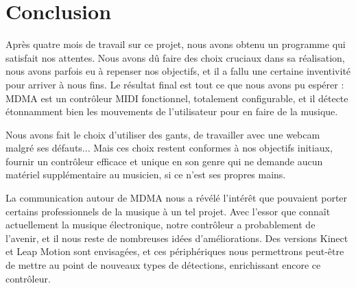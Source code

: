 \section{Conclusion}
\par Après quatre mois de travail sur ce projet, nous avons obtenu un programme qui satisfait nos attentes. Nous avons dû faire des choix cruciaux dans sa réalisation, nous avons parfois eu à repenser nos objectifs, et il a fallu une certaine inventivité pour arriver à nous fins. Le résultat final est tout ce que nous avons pu espérer : MDMA est un contrôleur MIDI fonctionnel, totalement configurable, et il détecte étonnamment bien les mouvements de l'utilisateur pour en faire de la musique. 
\par Nous avons fait le choix d'utiliser des gants, de travailler avec une webcam malgré ses défauts... Mais ces choix restent conformes à nos objectifs initiaux, fournir un contrôleur efficace et unique en son genre qui ne demande aucun matériel supplémentaire au musicien, si ce n'est ses propres mains.
\par La communication autour de MDMA nous a révélé l'intérêt que pouvaient porter certains professionnels de la musique à un tel projet. Avec l'essor que connaît actuellement la musique électronique, notre contrôleur a probablement de l'avenir, et il nous reste de nombreuses idées d'améliorations. Des versions Kinect et Leap Motion sont envisagées, et ces périphériques nous permettrons peut-être de mettre au point de nouveaux types de détections, enrichissant encore ce contrôleur.

